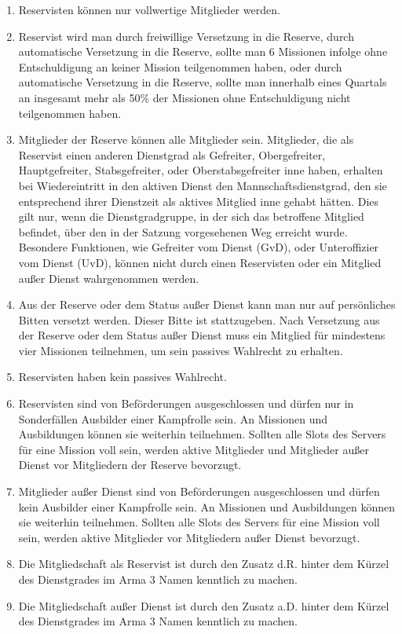 \begin{enumerate}[label=(\arabic*)]
\begin{enumerate}[label=(\Alph*)]
	\end{enumerate}
    \item Reservisten können nur vollwertige Mitglieder werden.    
    \item\label{itm:versetzung_reserve} Reservist wird man durch freiwillige Versetzung in die Reserve, durch automatische Versetzung in die Reserve, sollte man 6 Missionen infolge ohne Entschuldigung an keiner Mission teilgenommen haben, oder durch automatische Versetzung in die Reserve, sollte man innerhalb eines Quartals an insgesamt mehr als 50\% der Missionen ohne Entschuldigung nicht teilgenommen haben.    
    \item Mitglieder der Reserve können alle Mitglieder sein. Mitglieder, die als Reservist einen anderen Dienstgrad als Gefreiter, Obergefreiter, Hauptgefreiter, Stabsgefreiter, oder Oberstabsgefreiter inne haben, erhalten bei Wiedereintritt in den aktiven Dienst den Mannschaftsdienstgrad, den sie entsprechend ihrer Dienstzeit als aktives Mitglied inne gehabt hätten. Dies gilt nur, wenn die Dienstgradgruppe, in der sich das betroffene Mitglied befindet, über den in der Satzung vorgesehenen Weg erreicht wurde. Besondere Funktionen, wie Gefreiter vom Dienst (GvD), oder Unteroffizier vom Dienst (UvD), können nicht durch einen Reservisten oder ein Mitglied außer Dienst wahrgenommen werden.   
    \item Aus der Reserve oder dem Status außer Dienst kann man nur auf persönliches Bitten versetzt werden. Dieser Bitte ist stattzugeben. Nach Versetzung aus der Reserve oder dem Status außer Dienst muss ein Mitglied für mindestens vier Missionen teilnehmen, um sein passives Wahlrecht zu erhalten.    
    \item Reservisten haben kein passives Wahlrecht.    
    \item Reservisten sind von Beförderungen ausgeschlossen und dürfen nur in Sonderfällen Ausbilder einer Kampfrolle sein. An Missionen und Ausbildungen können sie weiterhin teilnehmen. Sollten alle Slots des Servers für eine Mission voll sein, werden aktive Mitglieder und Mitglieder außer Dienst vor Mitgliedern der Reserve bevorzugt.   
    \item Mitglieder außer Dienst sind von Beförderungen ausgeschlossen und dürfen kein Ausbilder einer Kampfrolle sein. An Missionen und Ausbildungen können sie weiterhin teilnehmen. Sollten alle Slots des Servers für eine Mission voll sein, werden aktive Mitglieder vor Mitgliedern außer Dienst bevorzugt.    
    \item Die Mitgliedschaft als Reservist ist durch den Zusatz d.R. hinter dem Kürzel des Dienstgrades im Arma 3 Namen kenntlich zu machen.   
    \item Die Mitgliedschaft außer Dienst ist durch den Zusatz a.D. hinter dem Kürzel des Dienstgrades im Arma 3 Namen kenntlich zu machen.
\end{enumerate}
